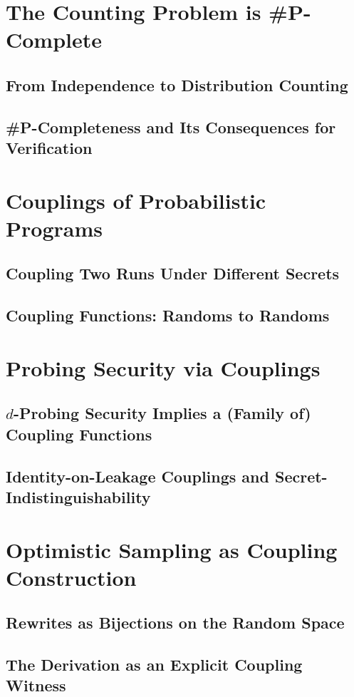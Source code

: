 \documentclass{report}
\begin{document}
\section{The Counting Problem is \#P-Complete} %
  \subsection{From Independence to Distribution Counting}
  \subsection{\#P-Completeness and Its Consequences for Verification}
\section{Couplings of Probabilistic Programs}
  \subsection{Coupling Two Runs Under Different Secrets}
  \subsection{Coupling Functions: Randoms to Randoms} %
\section{Probing Security via Couplings}
  \subsection{$d$-Probing Security Implies a (Family of) Coupling Functions} 
  \subsection{Identity-on-Leakage Couplings and Secret-Indistinguishability}
\section{Optimistic Sampling as Coupling Construction}
  \subsection{Rewrites as Bijections on the Random Space}
  \subsection{The Derivation as an Explicit Coupling Witness}
\end{document}
